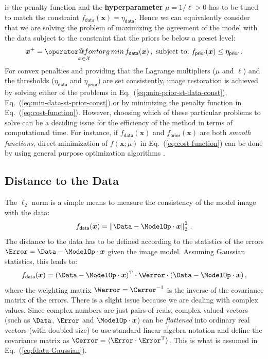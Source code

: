 \documentclass{article}
\makeatletter
\newcommand{\vocab}[1]{\textbf{#1}}
\newcommand{\MathFuncWithLimits}[1]{\mathop{\operator@font #1}\limits}
\newcommand{\Tag}[1]{\mathsf{#1}}        %
\newcommand{\V}[1]{\boldsymbol{#1}}      %
\newcommand{\T}{^\mathrm{T}}             %
\newcommand{\QuadTerm}[2]{ #2\T\cdot #1\cdot #2}
\newcommand{\Norm}[1]{\left\Vert #1\right\Vert}
\newcommand{\avg}[1]{\langle #1\rangle}
\newcommand{\argmin}{\MathFuncWithLimits{arg\,min}}
\newcommand{\Eq}[1]{Eq.~(\ref{#1})}
\newcommand{\Param}{x}
\newcommand{\VParam}{\V{\Param}}
\newcommand{\FeasibleSet}{\mathcal{X}}
\newcommand{\DataTag}{\Tag{data}}
\newcommand{\PriorTag}{\Tag{prior}}
\newcommand{\DataLevel}{\eta_\DataTag}
\newcommand{\PriorLevel}{\eta_\PriorTag}
\newcommand{\Fcost}{f}
\newcommand{\Fdata}{\Fcost_\DataTag}
\newcommand{\Fprior}{\Fcost_\PriorTag}
\makeatother
\begin{document}
is the penalty function and the \vocab{hyperparameter} $\mu=1/\ell>0$ has to
be tuned to match the constraint $\Fdata(\VParam)=\DataLevel$.  Hence we can
equivalently consider that we are solving the problem of maximizing the
agreement of the model with the data subject to the constraint that the priors
be below a preset level:
\begin{equation}
  \label{eq:min-data-st-prior-const}
  \VParam^{+} = \argmin_{\VParam\in\FeasibleSet} \Fdata(\VParam)
  \,,\ \text{subject to:\ }
  \Fprior(\VParam) \le \PriorLevel \, .
\end{equation}
For convex penalties and providing that the Lagrange multipliers ($\mu$ and
$\ell$) and the thresholds ($\DataLevel$ and $\PriorLevel$) are set
consistently, image restoration is achieved by solving either of the problems
in \Eq{eq:min-prior-st-data-const}, \Eq{eq:min-data-st-prior-const} or by
minimizing the penalty function in \Eq{eq:cost-function}.  However, choosing
which of these particular problems to solve can be a deciding issue for the
efficiency of the method in terms of computational time.  For instance, if
$\Fdata(\VParam)$ and $\Fprior(\VParam)$ are both \emph{smooth functions},
direct minimization of $\Fcost(\VParam; \mu)$ in \Eq{eq:cost-function} can be
done by using general purpose optimization algorithms
\citep{Nocedal_Wright-2006-numerical_optimization}.


\subsection{Distance to the Data}
\label{sec:fdata}

The $\ell_2$ norm is a simple means to measure the consistency of the model
image with the data:
\begin{equation}
  \label{eq:fdata-L2}
  \Fdata(\VParam) = \Norm{\Data - \ModelOp\cdot\VParam}^2_2\,.
\end{equation}
The distance to the data has to be defined according to the statistics of the
errors $\Error = \Data - \ModelOp\cdot\VParam$ given the image model.
Assuming Gaussian statistics, this leads to:
\begin{equation}
  \label{eq:fdata-Gaussian}
  \Fdata(\VParam) =
  \QuadTerm{\Werror}{(\Data - \ModelOp\cdot\VParam)} \,,
\end{equation}
where the weighting matrix $\Werror=\Cerror^{-1}$ is the inverse of the
covariance matrix of the errors.  There is a slight issue because we are
dealing with complex values.  Since complex numbers are just pairs of reals,
complex valued vectors (such as $\Data$, $\Error$ and $\ModelOp\cdot\VParam$)
can be \emph{flattened} into ordinary real vectors (with doubled size) to use
standard linear algebra notation and define the covariance matrix as
$\Cerror=\avg{\Error\cdot\Error\T}$.  This is what is assumed in
\Eq{eq:fdata-Gaussian}.
\end{document}
